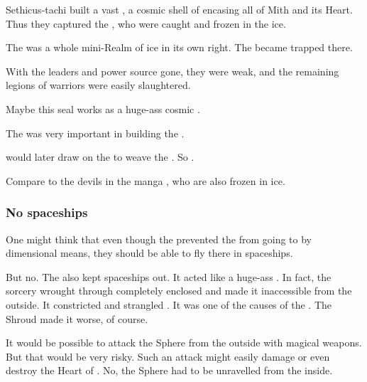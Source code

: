 Sethicus-tachi built a vast \CrystalSphere, a cosmic shell of  encasing all of Mith and its Heart. 
Thus they captured the \banelords, who were caught and frozen in the ice. 

The \CrystalSphere{} was a whole mini-Realm of ice in its own right. 
The \banelords{} became trapped there. 

With the \banesz{} leaders and power source gone, they were weak, and the remaining legions of \bane{} warriors were easily slaughtered. 

Maybe this seal works as a huge-ass cosmic . 

The \xs{}  was very important in building the \CrystalSphere. 

\Daggerrain{} would later draw on the \CrystalSphere{} to weave the . 
So . 

Compare to the devils in the manga \cite{NagaiGo:Devilman}, who are also frozen in ice. 





\subsubsection{No spaceships}
One might think that even though the \CrystalSphere{} prevented the \banelords{} from going to \Miith{} by dimensional means, they should be able to fly there in spaceships. 

But no. 
The \CrystalSphere{} also kept spaceships out. 
It acted like a huge-ass . 
In fact, the sorcery wrought through \NaathKurRamalech{} completely enclosed \Miith{} and made it inaccessible from the outside. 
It constricted and strangled \Miith{}. 
It was one of the causes of the . 
The Shroud made it worse, of course. 

It would be possible to attack the Sphere from the outside with magical weapons. 
But that would be very risky. 
Such an attack might easily damage or even destroy the Heart of \Miith. 
No, the Sphere had to be unravelled from the inside. 
















